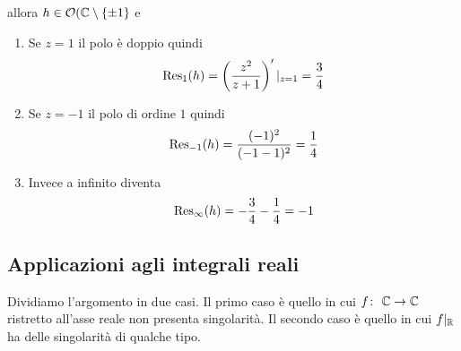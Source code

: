 \begin{example}
\begin{enumerate}
         allora $h \in \mathcal{O}(\mathbb{C} \setminus \left\{ \pm 1 \right\}$ e 
           \begin{enumerate}
             \item Se $z = 1$ il polo è doppio quindi 
               \begin{equation*}
                 \operatorname{Res}_1(h) = \left(\frac{z^2}{z+1}\right)'|_{z = 1} = \frac{3}{4}
               \end{equation*}
             \item Se $z = -1$ il polo di ordine $1$ quindi
               \begin{equation*}
                 \operatorname{Res}_{-1}(h) = \frac{(-1)^2}{(-1-1)^2} = \frac{1}{4} 
               \end{equation*}
             \item Invece a infinito diventa 
               \begin{equation*}
                 \operatorname{Res}_\infty(h) = - \frac{3}{4} - \frac{1}{4} = -1
               \end{equation*}
           \end{enumerate}
  \end{enumerate}
\end{example}


\subsection{\textcolor{AnComp}{\textbf{Applicazioni agli integrali reali}}}

Dividiamo l'argomento in due casi. Il primo caso è quello in cui
$f \colon\ \mathbb{C} \rightarrow \mathbb{C}$ ristretto all'asse reale non presenta singolarità. Il
secondo caso è quello in cui $f|_{\mathbb{R}}$ ha delle singolarità di qualche tipo.

